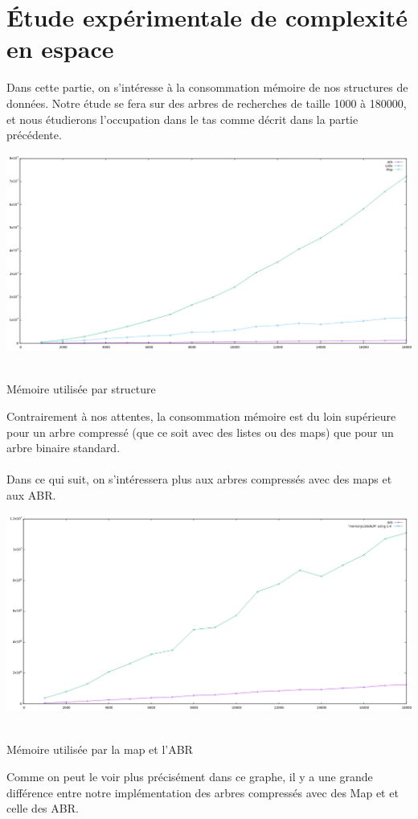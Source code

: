 \section{Étude expérimentale de complexité en espace}
Dans cette partie, on s'intéresse à la consommation mémoire de nos structures de données. Notre étude se fera sur des arbres de recherches de taille 1000 à 180000, et nous étudierons l'occupation dans le tas comme décrit dans la partie précédente.
\begin{center}
    \includegraphics[scale=0.38]{assets/memory_alm.png}
    \caption{\\ Mémoire utilisée par structure}
\end{center}

Contrairement à nos attentes, la consommation mémoire est du loin supérieure pour un arbre compressé (que ce soit avec des listes ou des maps) que pour un arbre binaire standard.

\paragraph{}
Dans ce qui suit, on s'intéressera plus aux arbres compressés avec des maps et aux ABR.

\begin{center}
    \includegraphics[scale=0.38]{assets/memory_am.png}
    \caption{\\ Mémoire utilisée par la map et l'ABR}
\end{center}
Comme on peut le voir plus précisément dans ce graphe, il y a une grande différence entre notre implémentation des arbres compressés avec des Map et et celle des ABR.


